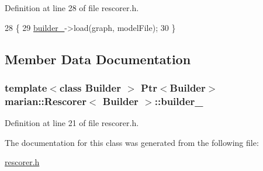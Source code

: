 Definition at line 28 of file rescorer.\+h.


\begin{DoxyCode}
28                                                                     \{
29     \hyperlink{classmarian_1_1Rescorer_ade8d099ced1d21c036c6aa38293ba5e9}{builder\_}->load(graph, modelFile);
30   \}
\end{DoxyCode}


\subsection{Member Data Documentation}
\subsubsection[{\texorpdfstring{builder\+\_\+}{builder_}}]{\setlength{\rightskip}{0pt plus 5cm}template$<$class Builder $>$ {\bf Ptr}$<$Builder$>$ {\bf marian\+::\+Rescorer}$<$ Builder $>$\+::builder\+\_\+\hspace{0.3cm}{\ttfamily [private]}}\hypertarget{classmarian_1_1Rescorer_ade8d099ced1d21c036c6aa38293ba5e9}{}\label{classmarian_1_1Rescorer_ade8d099ced1d21c036c6aa38293ba5e9}


Definition at line 21 of file rescorer.\+h.



The documentation for this class was generated from the following file\+:\begin{DoxyCompactItemize}
\item 
\hyperlink{rescorer_8h}{rescorer.\+h}\end{DoxyCompactItemize}
